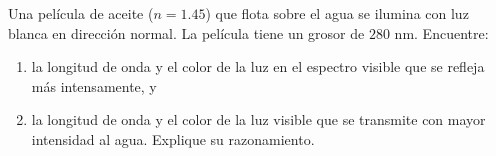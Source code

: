 \item Una película de aceite ($n = 1.45$) que flota sobre el agua se ilumina con luz blanca en dirección normal. La película tiene un grosor de $280\text{ nm}$. Encuentre:
\begin{enumerate}
    \item la longitud de onda y el color de la luz en el espectro visible que se refleja más intensamente, y
    \item la longitud de onda y el color de la luz visible que se transmite con mayor intensidad al agua. Explique su razonamiento.
\end{enumerate}